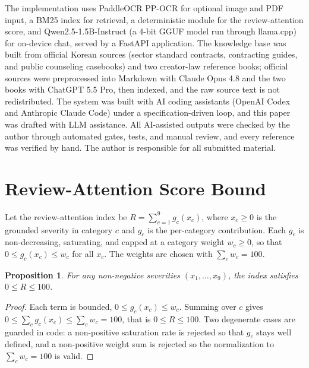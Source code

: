 \documentclass{article}
\theoremstyle{plain}
\newtheorem{proposition}{Proposition}
\begin{document}
The implementation uses PaddleOCR PP-OCR for optional image and PDF input, a BM25
index for retrieval, a deterministic module for the review-attention score, and
Qwen2.5-1.5B-Instruct (a $4$-bit GGUF model run through llama.cpp) for on-device
chat, served by a FastAPI application. The knowledge base was built from official
Korean sources (sector standard contracts, contracting guides, and public
counseling casebooks) and two creator-law reference books; official sources were
preprocessed into Markdown with Claude Opus 4.8 and the two books with ChatGPT
5.5 Pro, then indexed, and the raw source text is not redistributed. The system
was built with AI coding assistants (OpenAI Codex and Anthropic Claude Code) under
a specification-driven loop, and this paper was drafted with LLM assistance. All
AI-assisted outputs were checked by the author through automated gates, tests, and
manual review, and every reference was verified by hand. The author is responsible
for all submitted material.




\newpage
\appendix
\onecolumn

\section{Review-Attention Score Bound}
\label{app:bound}

Let the review-attention index be $R=\sum_{c=1}^{9} g_c(x_c)$, where $x_c\ge 0$ is
the grounded severity in category $c$ and $g_c$ is the per-category contribution.
Each $g_c$ is non-decreasing, saturating, and capped at a category weight $w_c\ge
0$, so that $0 \le g_c(x_c) \le w_c$ for all $x_c$. The weights are chosen with
$\sum_{c} w_c = 100$.

\begin{proposition}
\label{prop:bound}
For any non-negative severities $(x_1,\dots,x_9)$, the index satisfies
$0 \le R \le 100$.
\end{proposition}

\begin{proof}
Each term is bounded, $0 \le g_c(x_c) \le w_c$. Summing over $c$ gives
$0 \le \sum_c g_c(x_c) \le \sum_c w_c = 100$, that is $0 \le R \le 100$. Two
degenerate cases are guarded in code: a non-positive saturation rate is rejected
so that $g_c$ stays well defined, and a non-positive weight sum is rejected so the
normalization to $\sum_c w_c = 100$ is valid.
\end{proof}
\end{document}
